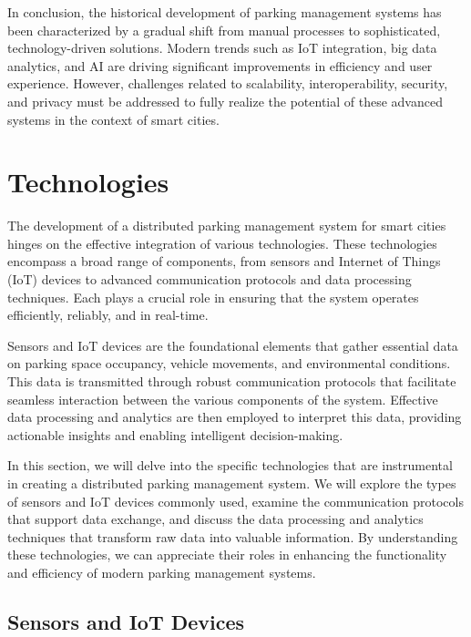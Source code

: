 \documentclass[oneside, 12pt, a4paper, draft]{book}
\begin{document}
In conclusion, the historical development of parking management systems has been characterized by a gradual shift from manual processes to sophisticated, technology-driven solutions. Modern trends such as IoT integration, big data analytics, and AI are driving significant improvements in efficiency and user experience. However, challenges related to scalability, interoperability, security, and privacy must be addressed to fully realize the potential of these advanced systems in the context of smart cities.
\chapter{Technologies}
\label{sec:org2097d3c}
The development of a distributed parking management system for smart cities hinges on the effective integration of various technologies. These technologies encompass a broad range of components, from sensors and Internet of Things (IoT) devices to advanced communication protocols and data processing techniques. Each plays a crucial role in ensuring that the system operates efficiently, reliably, and in real-time.

Sensors and IoT devices are the foundational elements that gather essential data on parking space occupancy, vehicle movements, and environmental conditions. This data is transmitted through robust communication protocols that facilitate seamless interaction between the various components of the system. Effective data processing and analytics are then employed to interpret this data, providing actionable insights and enabling intelligent decision-making.

In this section, we will delve into the specific technologies that are instrumental in creating a distributed parking management system. We will explore the types of sensors and IoT devices commonly used, examine the communication protocols that support data exchange, and discuss the data processing and analytics techniques that transform raw data into valuable information. By understanding these technologies, we can appreciate their roles in enhancing the functionality and efficiency of modern parking management systems.
\section{Sensors and IoT Devices}
\label{sec:org189c715}
\end{document}
